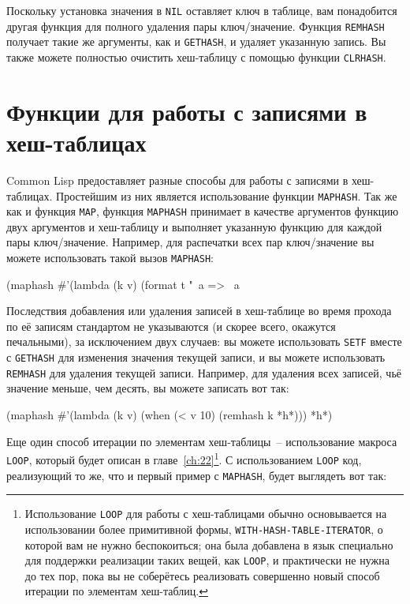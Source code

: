 Поскольку установка значения в \lstinline{NIL} оставляет ключ в таблице, вам понадобится другая
функция для полного удаления пары ключ/значение.  Функция \lstinline{REMHASH} получает такие же
аргументы, как и \lstinline{GETHASH}, и удаляет указанную запись.  Вы также можете полностью
очистить хеш-таблицу с помощью функции \lstinline{CLRHASH}.


\section{Функции для работы с записями в хеш-таблицах}

Common Lisp предоставляет разные способы для работы с записями в хеш-таблицах.  Простейшим
из них является использование функции \lstinline{MAPHASH}.  Так же как и функция \lstinline{MAP},
функция \lstinline{MAPHASH} принимает в качестве аргументов функцию двух аргументов и
хеш-таблицу и выполняет указанную функцию для каждой пары ключ/значение.  Например, для
распечатки всех пар ключ/значение вы можете использовать такой вызов \lstinline{MAPHASH}:

\begin{myverb}
(maphash #'(lambda (k v) (format t "~a => ~a~%
\end{myverb}

Последствия добавления или удаления записей в хеш-таблице во время прохода по её записям
стандартом не указываются (и скорее всего, окажутся печальными), за исключением двух
случаев: вы можете использовать \lstinline{SETF} вместе с \lstinline{GETHASH} для изменения значения
текущей записи, и вы можете использовать \lstinline{REMHASH} для удаления текущей записи.
Например, для удаления всех записей, чьё значение меньше, чем десять, вы можете записать
вот так:

\begin{myverb}
(maphash #'(lambda (k v) (when (< v 10) (remhash k *h*))) *h*)
\end{myverb}

Еще один способ итерации по элементам хеш-таблицы~-- использование макроса
\lstinline{LOOP}, который будет описан в главе~\ref{ch:22}\footnote{Использование \lstinline{LOOP} для
  работы с хеш-таблицами обычно основывается на использовании более примитивной формы,
  \lstinline{WITH-HASH-TABLE-ITERATOR}, о которой вам не нужно беспокоиться; она была добавлена
  в язык специально для поддержки реализации таких вещей, как \lstinline{LOOP}, и практически не
  нужна до тех пор, пока вы не соберётесь реализовать совершенно новый способ итерации по
  элементам хеш-таблиц.}\hspace{\footnotenegspace}.  С использованием \lstinline{LOOP} код, реализующий то же, что и первый
пример с \lstinline{MAPHASH}, будет выглядеть вот так:

